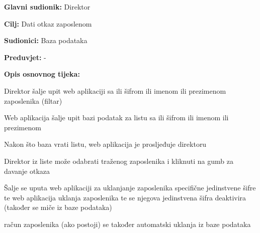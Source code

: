 				\noindent {}
				\begin{packed_item}
					
					\item \textbf{Glavni sudionik:} Direktor
					\item  \textbf{Cilj:} Dati otkaz zaposlenom
					\item  \textbf{Sudionici:} Baza podataka
					\item  \textbf{Preduvjet:} -
					\item  \textbf{Opis osnovnog tijeka:}
					
					\item[] \begin{packed_enum}
						
						\item Direktor šalje upit web aplikaciji sa ili šifrom ili imenom ili prezimenom zaposlenika (filtar)
						\item Web aplikacija šalje upit bazi podatak za listu sa ili šifrom ili imenom ili prezimenom 
						\item Nakon što baza vrati listu, web aplikacija je prosljeđuje direktoru
						\item Direktor iz liste može odabrati traženog zaposlenika i kliknuti na gumb za davanje otkaza
						\item Šalje se uputa web aplikaciji za uklanjanje zaposlenika specifične jedinstvene šifre te web aplikacija uklanja zaposlenika te se njegova jedinstvena šifra deaktivira (također se miče iz baze podataka)
						\item račun zaposlenika (ako postoji) se također automatski uklanja iz baze podataka
								
					\end{packed_enum}
					
				\end{packed_item}

